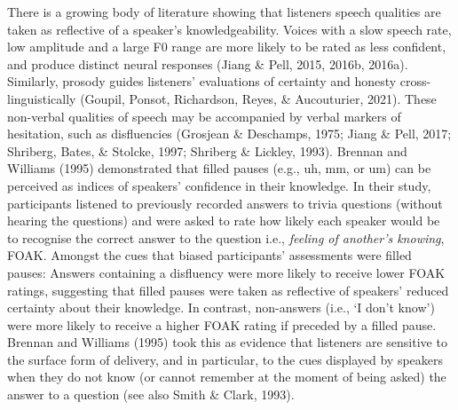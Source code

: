 \documentclass[
  man,floatsintext]{apa6}
\begin{document}
There is a growing body of literature showing that listeners speech qualities are taken as reflective of a speaker's knowledgeability. Voices with a slow speech rate, low amplitude and a large F0 range are more likely to be rated as less confident, and produce distinct neural responses (Jiang \& Pell, 2015, 2016b, 2016a). Similarly, prosody guides listeners' evaluations of certainty and honesty cross-linguistically (Goupil, Ponsot, Richardson, Reyes, \& Aucouturier, 2021). These non-verbal qualities of speech may be accompanied by verbal markers of hesitation, such as disfluencies (Grosjean \& Deschamps, 1975; Jiang \& Pell, 2017; Shriberg, Bates, \& Stolcke, 1997; Shriberg \& Lickley, 1993). Brennan and Williams (1995) demonstrated that filled pauses (e.g., uh, mm, or um) can be perceived as indices of speakers' confidence in their knowledge. In their study, participants listened to previously recorded answers to trivia questions (without hearing the questions) and were asked to rate how likely each speaker would be to recognise the correct answer to the question i.e., \emph{feeling of another's knowing}, FOAK. Amongst the cues that biased participants' assessments were filled pauses: Answers containing a disfluency were more likely to receive lower FOAK ratings, suggesting that filled pauses were taken as reflective of speakers' reduced certainty about their knowledge. In contrast, non-answers (i.e., `I don't know') were more likely to receive a higher FOAK rating if preceded by a filled pause. Brennan and Williams (1995) took this as evidence that listeners are sensitive to the surface form of delivery, and in particular, to the cues displayed by speakers when they do not know (or cannot remember at the moment of being asked) the answer to a question (see also Smith \& Clark, 1993).
\end{document}

